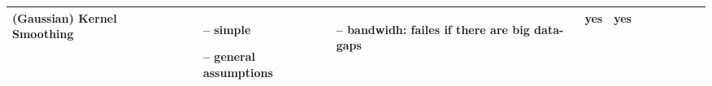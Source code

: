 \begin{table}[!ht]
\begin{tabular}{p{1.6cm}p{3.3cm}p{3.3cm}p{3.4cm}p{0.4cm}p{0.4cm}p{3cm}p{3cm}p{3cm}p{3cm}p{3cm}p{3cm}|}


		(Gaussian) Kernel Smoothing                                                                                                                                  &
		~                                                                                                                                                            &
		\begin{cptitemize} \item[--]  simple \item[--]  general assumptions                                                                  \end{cptitemize}        &
		\begin{cptitemize} \item[--]  bandwidh: failes if there are big data-gaps                                                     \end{cptitemize}               &
		yes                                                                                                                                                          &
		yes                                                                                                                                                            \\ \hline%


\end{tabular}
\end{table}
